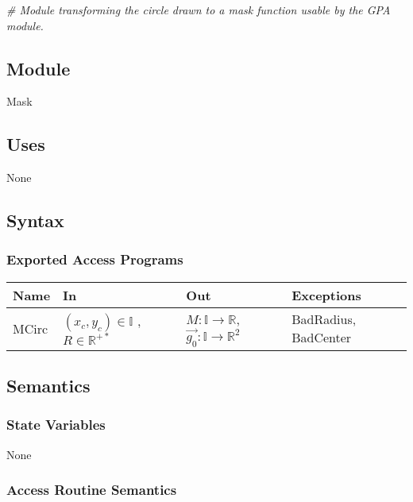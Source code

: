 \documentclass[12pt, titlepage]{article}
\begin{document}
\noindent\textit{{\#} Module transforming the circle drawn to a mask function 
usable by the GPA module.}


\subsection{Module}
Mask
\subsection{Uses}
None

\subsection{Syntax}

\subsubsection{Exported Access Programs}

\begin{center}
\begin{tabular}{p{2cm} p{4cm} p{4cm} p{2cm}}
\hline
\textbf{Name} & \textbf{In} & \textbf{Out} & \textbf{Exceptions} \\
\hline
MCirc & $(x_c,y_c) \in \mathbb{I}$ , $R \in \mathbb{R}^{+*}$ & 
$M:\mathbb{I}\rightarrow\mathbb{R}$, $\overrightarrow{g_0} 
:\mathbb{I}\rightarrow\mathbb{R}^2$ & BadRadius, BadCenter\\
\hline
\end{tabular}
\end{center}

\subsection{Semantics}

\subsubsection{State Variables}
None

\subsubsection{Access Routine Semantics}
\end{document}
